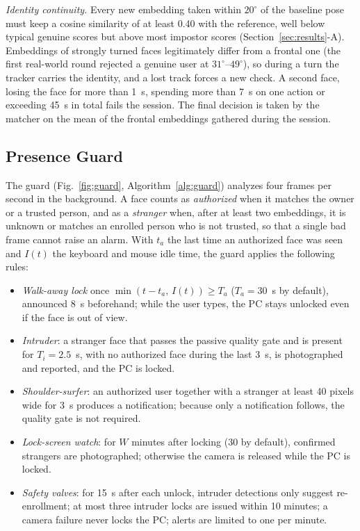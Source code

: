 \documentclass[journal]{IEEEtran}
\begin{document}
\emph{Identity continuity.} Every new embedding taken within $20^\circ$ of the baseline pose must keep a cosine similarity of at least 0.40 with the reference, well below typical genuine scores but above most impostor scores (Section~\ref{sec:results}-A). Embeddings of strongly turned faces legitimately differ from a frontal one (the first real-world round rejected a genuine user at $31^\circ$--$49^\circ$), so during a turn the tracker carries the identity, and a lost track forces a new check. A second face, losing the face for more than 1~s, spending more than 7~s on one action or exceeding 45~s in total fails the session. The final decision is taken by the matcher on the mean of the frontal embeddings gathered during the session.

\subsection{Presence Guard}\label{sec:guard}
The guard (Fig.~\ref{fig:guard}, Algorithm~\ref{alg:guard}) analyzes four frames per second in the background. A face counts as \emph{authorized} when it matches the owner or a trusted person, and as a \emph{stranger} when, after at least two embeddings, it is unknown or matches an enrolled person who is not trusted, so that a single bad frame cannot raise an alarm. With $t_a$ the last time an authorized face was seen and $I(t)$ the keyboard and mouse idle time, the guard applies the following rules:
\begin{itemize}
\item \emph{Walk-away lock} once $\min(t-t_a,\,I(t))\ge T_a$ ($T_a=30$~s by default), announced 8~s beforehand; while the user types, the PC stays unlocked even if the face is out of view.
\item \emph{Intruder}: a stranger face that passes the passive quality gate and is present for $T_i=2.5$~s, with no authorized face during the last 3~s, is photographed and reported, and the PC is locked.
\item \emph{Shoulder-surfer}: an authorized user together with a stranger at least 40 pixels wide for 3~s produces a notification; because only a notification follows, the quality gate is not required.
\item \emph{Lock-screen watch}: for $W$ minutes after locking (30 by default), confirmed strangers are photographed; otherwise the camera is released while the PC is locked.
\item \emph{Safety valves}: for 15~s after each unlock, intruder detections only suggest re-enrollment; at most three intruder locks are issued within 10 minutes; a camera failure never locks the PC; alerts are limited to one per minute.
\end{itemize}
\end{document}

